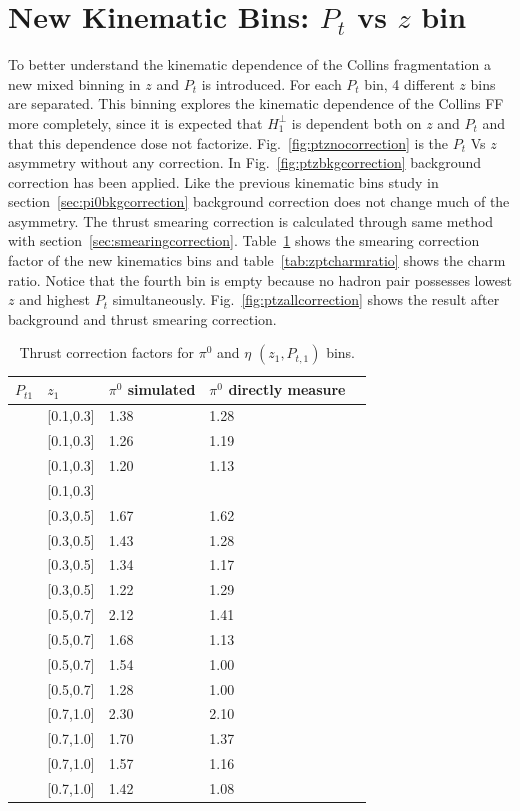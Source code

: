 \section{\texorpdfstring{New Kinematic Bins: $P_t$ vs $z$ bin}{New kinematic Bins: pt Vs z bin}}
\label{sec:newbins}
To better understand the kinematic dependence of the Collins fragmentation a new mixed binning in $z$ and $P_t$ is introduced. For each $P_t$ bin, 4 different $z$ bins are separated. This binning explores the kinematic dependence of the Collins FF more completely, since it is expected that $H_1^{\bot}$ is dependent both on $z$ and $P_t$ and that this dependence dose not factorize. Fig.~\ref{fig:ptznocorrection} is the $P_t$ Vs $z$ asymmetry without any correction. In Fig.~\ref{fig:ptzbkgcorrection} background correction has been applied. Like the previous kinematic bins study in section~\ref{sec:pi0bkgcorrection} background correction does not change much of the asymmetry. The thrust smearing correction is calculated through same method with section~\ref{sec:smearingcorrection}. Table~\ref{tab:16binsthrustfactor_compare} shows the smearing correction factor of the new kinematics bins and table~\ref{tab:zptcharmratio} shows the charm ratio. Notice that the fourth bin is empty because no hadron pair possesses lowest $z$ and highest $P_t$ simultaneously. Fig.~\ref{fig:ptzallcorrection} shows the result after background and thrust smearing correction. 
\begin{table}[H]\footnotesize
\centering
\begin{tabular}{|l|l|l|l|l|}
\hline
$P_{t1}$  & $z_{1}$ &  $\pi^0$ simulated  & $\pi^0$ directly measure   \\ \hline
[0,0.15] & [0.1,0.3]	&	1.38	&	1.28	\\ \hline
[0.15,0.3] & [0.1,0.3] 	&	1.26	&	1.19	\\ \hline
[0.3,0.5]  & [0.1,0.3] 	&	1.20	&	1.13	\\ \hline
[0.5,3] & [0.1,0.3]  	&		&		\\ \hline
[0,0.15] & [0.3,0.5]	&	1.67	&	1.62	\\ \hline
[0.15,0.3] & [0.3,0.5] 	&	1.43	&	1.28	\\ \hline
[0.3,0.5] & [0.3,0.5] 	&	1.34	&	1.17	\\ \hline
[0.5,3.0] & [0.3,0.5] 	&	1.22	&	1.29	\\ \hline
[0,0.15] & [0.5,0.7] 	&	2.12	&	1.41	\\ \hline
[0.15,0.3] & [0.5,0.7] 	&	1.68	&	1.13	\\ \hline
[0.3,0.5] & [0.5,0.7]  	&	1.54	&	1.00	\\ \hline
[0.5,3.0] & [0.5,0.7]  	&	1.28	&	1.00	\\ \hline
[0,0.15] & [0.7,1.0]	&	2.30	&	2.10	\\ \hline
[0.15,0.5]   & [0.7,1.0] 	&	1.70	&	1.37	\\ \hline
[0.3,0.5]  & [0.7,1.0] 	&	1.57	&	1.16	\\ \hline
[0.5,3.0] & [0.7,1.0]	&	1.42	&	1.08	\\ \hline
\end{tabular}
\caption{Thrust correction factors for $\pi^0$ and $\eta$ $(z_1,P_{t,1})$ bins.}
\label{tab:16binsthrustfactor_compare}
\end{table}


